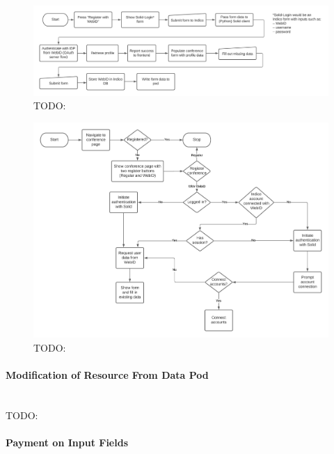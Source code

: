 \begin{figure}
    \centering
    \includegraphics[width=1\textwidth]{prototype/graphs/poc-conference_registration_flow-server_side-sideways.jpeg}
    \caption{TODO:}
    \label{fig:poc-conference_registration_flow-server_side-sideways}
\end{figure}

\begin{figure}
    \centering
    \includegraphics[width=1\textwidth]{prototype/graphs/poc-conference_registration_flow-sideways.jpeg}
    \caption{TODO:}
    \label{fig:poc-conference_registration_flow-sideways}
\end{figure}
\vspace{0.5cm}
\paragraph{Modification of Resource From Data Pod}\mbox{}\\

TODO:
\vspace{0.5cm}
\paragraph{Payment on Input Fields}\mbox{}\\


